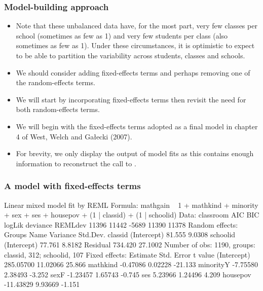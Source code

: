 \begin{frame}
  \frametitle{Model-building approach}
  \begin{itemize}
  \item Note that these unbalanced data have, for the most part,
    very few classes per school (sometimes as few as 1) and very few
    students per class (also sometimes as few as 1).  Under these
    circumstances, it is optimistic to expect to be able to partition
    the variability across students, classes and schools.
  \item We should consider adding fixed-effects terms and perhaps
    removing one of the random-effects terms.
  \item We will start by incorporating fixed-effects terms then
    revisit the need for both random-effects terms.
  \item We will begin with the fixed-effects terms adopted as a final
    model in chapter 4 of West, Welch and Ga\l{}ecki (2007).
  \item For brevity, we only display the output of model fits as this
    contains enough information to reconstruct the call to .
  \end{itemize}
\end{frame}

\begin{frame}[fragile]
  \frametitle{A model with fixed-effects terms}
\begin{Schunk}
\begin{Soutput}
Linear mixed model fit by REML 
Formula: mathgain ~ 1 + mathkind + minority + sex + ses + housepov + (1 |      classid) + (1 | schoolid) 
   Data: classroom 
   AIC   BIC logLik deviance REMLdev
 11396 11442  -5689    11390   11378
Random effects:
 Groups   Name        Variance Std.Dev.
 classid  (Intercept)  81.555   9.0308 
 schoolid (Intercept)  77.761   8.8182 
 Residual             734.420  27.1002 
Number of obs: 1190, groups: classid, 312; schoolid, 107
Fixed effects:
             Estimate Std. Error t value
(Intercept) 285.05700   11.02066  25.866
mathkind     -0.47086    0.02228 -21.133
minorityY    -7.75580    2.38493  -3.252
sexF         -1.23457    1.65743  -0.745
ses           5.23966    1.24496   4.209
housepov    -11.43829    9.93669  -1.151
\end{Soutput}
\end{Schunk}
\end{frame}

